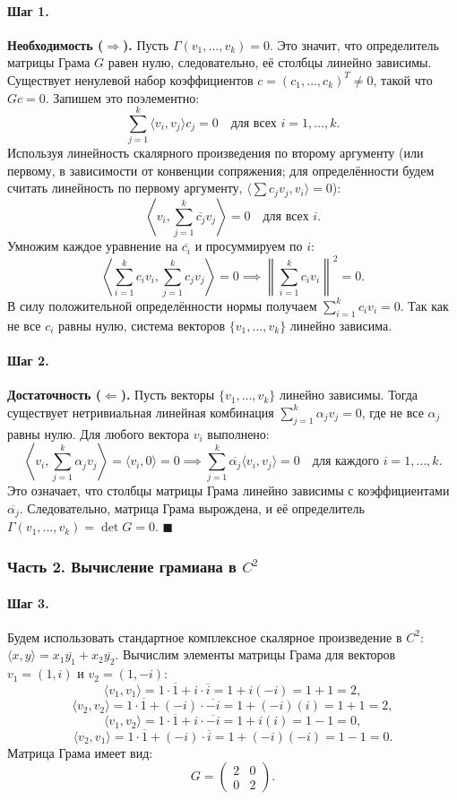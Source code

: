 \documentclass[12pt,a4paper]{article}
\theoremstyle{solution}
\newcommand{\step}[1]{\paragraph{Шаг #1.}}
\begin{document}
\step{1} \textbf{Необходимость ($\Rightarrow$).} Пусть $\Gamma(v_1, \ldots, v_k) = 0$. Это значит, что определитель матрицы Грама $G$ равен нулю, следовательно, её столбцы линейно зависимы. Существует ненулевой набор коэффициентов $c = (c_1, \ldots, c_k)^T \neq 0$, такой что $G c = 0$. Запишем это поэлементно:
\[
\sum_{j=1}^k \langle v_i, v_j\rangle c_j = 0 \quad \text{для всех } i = 1, \ldots, k.
\]
Используя линейность скалярного произведения по второму аргументу (или первому, в зависимости от конвенции сопряжения; для определённости будем считать линейность по первому аргументу, $\langle \sum c_j v_j, v_i \rangle = 0$):
\[
\left\langle v_i, \sum_{j=1}^k \overline{c_j} v_j \right\rangle = 0 \quad \text{для всех } i.
\]
Умножим каждое уравнение на $\overline{c_i}$ и просуммируем по $i$:
\[
\left\langle \sum_{i=1}^k c_i v_i, \sum_{j=1}^k c_j v_j \right\rangle = 0 \implies \left\| \sum_{i=1}^k c_i v_i \right\|^2 = 0.
\]
В силу положительной определённости нормы получаем $\sum_{i=1}^k c_i v_i = 0$. Так как не все $c_i$ равны нулю, система векторов $\{v_1, \ldots, v_k\}$ линейно зависима.

\step{2} \textbf{Достаточность ($\Leftarrow$).} Пусть векторы $\{v_1, \ldots, v_k\}$ линейно зависимы. Тогда существует нетривиальная линейная комбинация $\sum_{j=1}^k \alpha_j v_j = 0$, где не все $\alpha_j$ равны нулю.
Для любого вектора $v_i$ выполнено:
\[
\left\langle v_i, \sum_{j=1}^k \alpha_j v_j \right\rangle = \langle v_i, 0\rangle = 0 \implies \sum_{j=1}^k \overline{\alpha_j} \langle v_i, v_j\rangle = 0 \quad \text{для каждого } i = 1, \ldots, k.
\]
Это означает, что столбцы матрицы Грама линейно зависимы с коэффициентами $\overline{\alpha_j}$. Следовательно, матрица Грама вырождена, и её определитель $\Gamma(v_1, \ldots, v_k) = \det G = 0$. \quad$\blacksquare$

\subsubsection*{Часть 2. Вычисление грамиана в $C^2$}

\step{3} Будем использовать стандартное комплексное скалярное произведение в $C^2$: $\langle x, y\rangle = x_1\overline{y_1} + x_2\overline{y_2}$.
Вычислим элементы матрицы Грама для векторов $v_1 = (1, i)$ и $v_2 = (1, -i)$:
\[
\langle v_1, v_1\rangle = 1\cdot \overline{1} + i\cdot \overline{i} = 1 + i(-i) = 1 + 1 = 2,
\]
\[
\langle v_2, v_2\rangle = 1\cdot \overline{1} + (-i)\cdot \overline{-i} = 1 + (-i)(i) = 1 + 1 = 2,
\]
\[
\langle v_1, v_2\rangle = 1\cdot \overline{1} + i\cdot \overline{-i} = 1 + i(i) = 1 - 1 = 0,
\]
\[
\langle v_2, v_1\rangle = 1\cdot \overline{1} + (-i)\cdot \overline{i} = 1 + (-i)(-i) = 1 - 1 = 0.
\]
Матрица Грама имеет вид:
\[
G = \begin{pmatrix} 2 & 0 \\ 0 & 2 \end{pmatrix}.
\]
\end{document}
